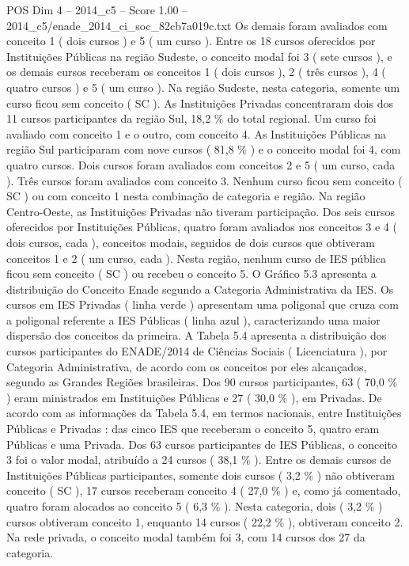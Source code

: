 \begin{textsample}{POS Dim 4 – 2014\_c5 – Score 1.00 – 2014\_c5/enade\_2014\_ci\_soc\_82cb7a019c.txt}
Os demais foram avaliados com conceito 1 ( dois cursos ) e 5 ( um curso ).
Entre os 18 cursos oferecidos por Instituições Públicas na região Sudeste, o conceito modal foi 3 ( sete cursos ), e os demais cursos receberam os conceitos 1 ( dois cursos ), 2 ( três cursos ), 4 ( quatro cursos ) e 5 ( um curso ).
Na região Sudeste, nesta categoria, somente um curso ficou sem conceito ( SC ).
As Instituições Privadas concentraram dois dos 11 cursos participantes da região Sul, 18,2 \% do total regional.
Um curso foi avaliado com conceito 1 e o outro, com conceito 4.
As Instituições Públicas na região Sul participaram com nove cursos ( 81,8 \% ) e o conceito modal foi 4, com quatro cursos.
Dois cursos foram avaliados com conceitos 2 e 5 ( um curso, cada ).
Três cursos foram avaliados com conceito 3.
Nenhum curso ficou sem conceito ( SC ) ou com conceito 1 nesta combinação de categoria e região.
Na região Centro-Oeste, as Instituições Privadas não tiveram participação.
Dos seis cursos oferecidos por Instituições Públicas, quatro foram avaliados nos conceitos 3 e 4 ( dois cursos, cada ), conceitos modais, seguidos de dois cursos que obtiveram conceitos 1 e 2 ( um curso, cada ).
Nesta região, nenhum curso de IES pública ficou sem conceito ( SC ) ou recebeu o conceito 5.
O Gráfico 5.3 apresenta a distribuição do Conceito Enade segundo a Categoria Administrativa da IES.
Os cursos em IES Privadas ( linha verde ) apresentam uma poligonal que cruza com a poligonal referente a IES Públicas ( linha azul ), caracterizando uma maior dispersão dos conceitos da primeira.
A Tabela 5.4 apresenta a distribuição dos cursos participantes do ENADE/2014 de Ciências Sociais ( Licenciatura ), por Categoria Administrativa, de acordo com os conceitos por eles alcançados, segundo as Grandes Regiões brasileiras.
Dos 90 cursos participantes, 63 ( 70,0 \% ) eram ministrados em Instituições Públicas e 27 ( 30,0 \% ), em Privadas.
De acordo com as informações da Tabela 5.4, em termos nacionais, entre Instituições Públicas e Privadas : das cinco IES que receberam o conceito 5, quatro eram Públicas e uma Privada.
Dos 63 cursos participantes de IES Públicas, o conceito 3 foi o valor modal, atribuído a 24 cursos ( 38,1 \% ).
Entre os demais cursos de Instituições Públicas participantes, somente dois cursos ( 3,2 \% ) não obtiveram conceito ( SC ), 17 cursos receberam conceito 4 ( 27,0 \% ) e, como já comentado, quatro foram alocados ao conceito 5 ( 6,3 \% ).
Nesta categoria, dois ( 3,2 \% ) cursos obtiveram conceito 1, enquanto 14 cursos ( 22,2 \% ), obtiveram conceito 2.
Na rede privada, o conceito modal também foi 3, com 14 cursos dos 27 da categoria.

\end{textsample}
